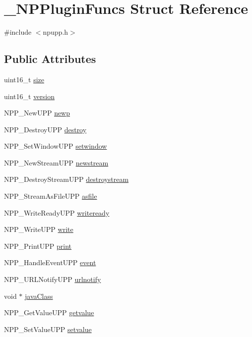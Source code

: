 \hypertarget{struct___n_p_plugin_funcs}{
\section{\_\-NPPluginFuncs Struct Reference}
\label{struct___n_p_plugin_funcs}
}


{\ttfamily \#include $<$npupp.h$>$}

\subsection*{Public Attributes}
\begin{DoxyCompactItemize}
\item 
uint16\_\-t \hyperlink{struct___n_p_plugin_funcs_ae56a05ff9615e602eeb6d750417b45ab}{size}
\item 
uint16\_\-t \hyperlink{struct___n_p_plugin_funcs_a86672b8f4c5e096d3858729fe12b97ae}{version}
\item 
NPP\_\-NewUPP \hyperlink{struct___n_p_plugin_funcs_a9aa4547435f9bffb2bc4174e5fac4155}{newp}
\item 
NPP\_\-DestroyUPP \hyperlink{struct___n_p_plugin_funcs_ae3b003906703936e083abbf151c689d3}{destroy}
\item 
NPP\_\-SetWindowUPP \hyperlink{struct___n_p_plugin_funcs_a6dd430e8402ff3904d58926dcb9b9243}{setwindow}
\item 
NPP\_\-NewStreamUPP \hyperlink{struct___n_p_plugin_funcs_a02578ccd3efa3691a1c17052e3525b64}{newstream}
\item 
NPP\_\-DestroyStreamUPP \hyperlink{struct___n_p_plugin_funcs_aaa1e8bcace0ebc3c7a6b487405a791f9}{destroystream}
\item 
NPP\_\-StreamAsFileUPP \hyperlink{struct___n_p_plugin_funcs_a8b9664b4af58ab81a4766159b5cfbdda}{asfile}
\item 
NPP\_\-WriteReadyUPP \hyperlink{struct___n_p_plugin_funcs_a34bbf1ebb2413c678eb003bb3781e005}{writeready}
\item 
NPP\_\-WriteUPP \hyperlink{struct___n_p_plugin_funcs_a0e4c5a8fc923e8bf77c7a6b957349dd3}{write}
\item 
NPP\_\-PrintUPP \hyperlink{struct___n_p_plugin_funcs_a61315ce968aa63b51556f77583e2d5a3}{print}
\item 
NPP\_\-HandleEventUPP \hyperlink{struct___n_p_plugin_funcs_a31a76dc9538baea794c00953c18ad2a9}{event}
\item 
NPP\_\-URLNotifyUPP \hyperlink{struct___n_p_plugin_funcs_abcc20eb63b3b3cb631bbb107bc91fa8e}{urlnotify}
\item 
void $\ast$ \hyperlink{struct___n_p_plugin_funcs_af5b980573ff4092423a02ec7bc742f60}{javaClass}
\item 
NPP\_\-GetValueUPP \hyperlink{struct___n_p_plugin_funcs_a15984d23dc460b1ec0c25505ddf00841}{getvalue}
\item 
NPP\_\-SetValueUPP \hyperlink{struct___n_p_plugin_funcs_a614987720847ebc92393044fbfe88994}{setvalue}
\end{DoxyCompactItemize}


